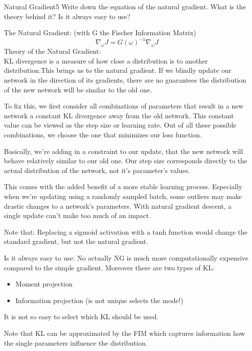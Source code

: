 \begin{questions}
	
\begin{question}[bonus]{Natural Gradient}{5}
	Write down the equation of the natural gradient. What is the theory behind it?
	Is it always easy to use?
	
\begin{answer}
The Natural Gradient: (with G the Fischer Information Matrix)
\begin{equation}
	\nabla_\omega J = G(\omega)^{-1} \nabla_\omega J
\end{equation}
Theory of the Natural Gradient:\\
KL divergence is a measure of how close a distribution is to another distribution.This brings us to the natural gradient. If we blindly update our network in the direction of its gradients, there are no guarantees the distribution of the new network will be similar to the old one.

To fix this, we first consider all combinations of parameters that result in a new network a constant KL divergence away from the old network. This constant value can be viewed as the step size or learning rate. Out of all these possible combinations, we choose the one that minimizes our loss function.

Basically, we're adding in a constraint to our update, that the new network will behave relatively similar to our old one. Our step size corresponds directly to the actual distribution of the network, not it's parameter's values.

This comes with the added benefit of a more stable learning process. Especially when we're updating using a randomly sampled batch, some outliers may make drastic changes to a network's parameters. With natural gradient descent, a single update can't make too much of an impact. 
	
Note that: Replacing a sigmoid activation with a tanh function would change the standard gradient, but not the natural gradient. 

Is it always easy to use:
No actually NG is much more computationally expensive compared to the simple gradient. Moreover there are two types of KL:
\begin{itemize}
	\item Moment projection
	\item Information projection (is not unique selects the mode!)
\end{itemize}

It is not so easy to select which KL should be used.

Note that KL can be approximated by the FIM which captures information how the single parameters influence the distribution.


\end{answer}
\end{question}

\end{questions}
